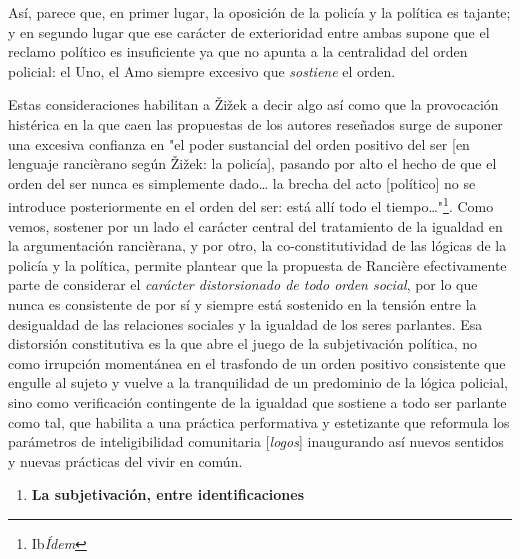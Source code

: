 \documentclass{book}
\begin{document}
Así, parece que, en primer lugar, la oposición de la policía y la
política es tajante; y en segundo lugar que ese carácter de exterioridad
entre ambas supone que el reclamo político es insuficiente ya que no
apunta a la centralidad del orden policial: el Uno, el Amo siempre
excesivo que \emph{sostiene} el orden.

Estas consideraciones habilitan a Žižek a decir algo así como que la
provocación histérica en la que caen las propuestas de los autores
reseñados surge de suponer una excesiva confianza en "el poder
sustancial del orden positivo del ser {[}en lenguaje rancièrano según
Žižek: la policía{]}, pasando por alto el hecho de que el orden del ser
nunca es simplemente dado\ldots{} la brecha del acto {[}político{]} no
se introduce posteriormente en el orden del ser: está allí todo el
tiempo\ldots"\footnote{Ib\emph{Ídem}}. Como vemos, sostener por un lado
el carácter central del tratamiento de la igualdad en la argumentación
rancièrana, y por otro, la co-constitutividad de las lógicas de la
policía y la política, permite plantear que la propuesta de Rancière
efectivamente parte de considerar el \emph{carácter distorsionado de
todo orden social}, por lo que nunca es consistente de por sí y siempre
está sostenido en la tensión entre la desigualdad de las relaciones
sociales y la igualdad de los seres parlantes. Esa distorsión
constitutiva es la que abre el juego de la subjetivación política, no
como irrupción momentánea en el trasfondo de un orden positivo
consistente que engulle al sujeto y vuelve a la tranquilidad de un
predominio de la lógica policial, sino como verificación contingente de
la igualdad que sostiene a todo ser parlante como tal, que habilita a
una práctica performativa y estetizante que reformula los parámetros de
inteligibilidad comunitaria {[}\emph{logos}{]} inaugurando así nuevos
sentidos y nuevas prácticas del vivir en común.

\begin{enumerate}
\def\labelenumi{\arabic{enumi}.}
\setcounter{enumi}{4}
\item
  \textbf{La subjetivación, entre identificaciones}
\end{enumerate}
\end{document}

